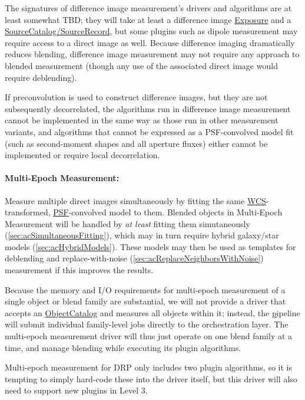 The signatures of difference image measurement's drivers and algorithms are at least somewhat TBD; they will take at least a difference image \hyperref[sec:spImagesExposure]{Exposure} and a \hyperref[sec:spTablesSource]{SourceCatalog/SourceRecord}, but some plugins such as dipole measurement may require access to a direct image as well.  Because difference imaging dramatically reduces blending, difference image measurement may not require any approach to blended measurement (though any use of the associated direct image would require deblending).

If preconvolution is used to construct difference images, but they are not subsequently decorrelated, the algorithms run in difference image measurement cannot be implemented in the same way as those run in other measurement variants, and algorithms that cannot be expressed as a PSF-convolved model fit (such as second-moment shapes and all aperture fluxes) either cannot be implemented or require local decorrelation.

\paragraph{Multi-Epoch Measurement:} Measure multiple direct images simultaneously by fitting the same \hyperref[sec:spWCS]{WCS}-transformed, \hyperref[sec:spPSF]{PSF}-convolved model to them.  Blended objects in Multi-Epoch Measurement will be handled by \emph{at least} fitting them simutaneously (\ref{sec:acSimultaneousFitting}), which may in turn require hybrid galaxy/star models (\ref{sec:acHybridModels}).  These models may then be used as templates for deblending and replace-with-noise (\ref{sec:acReplaceNeighborsWithNoise}) measurement if this improves the results.
\label{sec:acMultiEpochMeasurement}

Because the memory and I/O requirements for multi-epoch measurement of a single object or blend family are substantial, we will not provide a driver that accepts an \hyperref[sec:spTablesObject]{ObjectCatalog} and measures all objects within it; instead, the \hyperref[sec:drpMultiFit] pipeline will submit individual family-level jobs directly to the orchestration layer.  The multi-epoch measurement driver will thus just operate on one blend family at a time, and manage blending while executing its plugin algorithms.

Multi-epoch measurement for DRP only includes two plugin algorithms, so it is tempting to simply hard-code these into the driver itself, but this driver will also need to support new plugins in Level 3.

